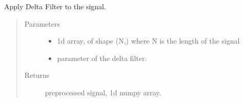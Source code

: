 \documentclass[letterpaper,10pt,english]{sphinxmanual}
\begin{document}
\begin{fulllineitems}
\label{\detokenize{pobm:pobm.prep.dfilter}}
Apply Delta Filter to the signal.
\begin{quote}\begin{description}
\item[{Parameters}] \leavevmode\begin{itemize}
\item {} 
 \textendash{} 1\sphinxhyphen{}d array, of shape (N,) where N is the length of the signal

\item {} 
 \textendash{} parameter of the delta filter.

\end{itemize}

\item[{Returns}] \leavevmode
preprocessed signal, 1\sphinxhyphen{}d numpy array.

\end{description}\end{quote}

\end{fulllineitems}

\end{document}
